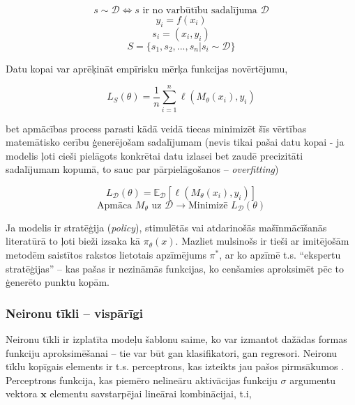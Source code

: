 \documentclass[12pt, a4paper]{article}
\numberwithin{equation}{section} %
\begin{document}
\begin{equation} 
    s \sim \mathcal{D} \Leftrightarrow s \text{ ir no varbūtību sadalījuma } \mathcal{D}
\end{equation}
\begin{equation} 
    y_i = f(x_i)
\end{equation}
\begin{equation} 
    s_i = (x_i, y_i)
\end{equation}
\begin{equation} 
    S = \lbrace s_1, s_2, ..., s_n \vert s_i \sim \mathcal{D}\rbrace
\end{equation}

Datu kopai var aprēķināt empīrisku mērķa funkcijas novērtējumu,

\begin{equation} 
    L_S(\theta) = \frac{1}{n}\sum_{i=1}^n\ell(M_{\theta}(x_i), y_i)
\end{equation}

bet apmācības process parasti kādā veidā tiecas minimizēt šīs vērtības matemātisko cerību ģenerējošam sadalījumam (nevis tikai pašai datu kopai - ja modelis ļoti cieši pielāgots konkrētai datu izlasei bet zaudē precizitāti sadalījumam kopumā, to sauc par pārpielāgošanos -- \textit{overfitting})

\begin{equation} 
    L_{\mathcal{D}}(\theta) = \mathbb{E}_{\mathcal{D}} [\ell(M_{\theta}(x_i), y_i)]
\end{equation}
\begin{equation} 
    \text{Apmāca } M_{\theta} \text{ uz } \mathcal{D} \rightarrow \text{Minimizē } L_{\mathcal{D}}(\theta)
\end{equation}

Ja modelis ir stratēģija (\textit{policy}), stimulētās vai atdarinošās mašīnmācīšanās literatūrā to ļoti bieži izsaka kā $\pi_{\theta}(x)$. Mazliet mulsinošs ir tieši ar imitējošām metodēm saistītos rakstos lietotais apzīmējums $\pi^*$, ar ko apzīmē t.s. ``ekspertu stratēģijas'' -- kas pašas ir nezināmās funkcijas, ko cenšamies aproksimēt pēc to ģenerēto punktu kopām. 


\subsubsection{Neironu tīkli -- vispārīgi}

Neironu tīkli ir izplatīta modeļu šablonu saime, ko var izmantot dažādas formas funkciju aproksimēšanai -- tie var būt gan klasifikatori, gan regresori. Neironu tīklu kopīgais elements ir t.s. perceptrons, kas izteikts jau pašos pirmsākumos \cite{mcculloch1943logical}. Perceptrons funkcija, kas piemēro nelineāru aktivācijas funkciju $\sigma$ argumentu vektora $ \boldsymbol{x}$ elementu savstarpējai lineārai kombinācijai, t.i,
\end{document}
